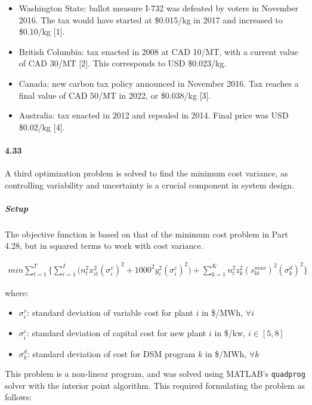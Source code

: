 \documentclass{article}
\begin{document}
	\begin{itemize}
		\item Washington State: ballot measure I-732 was defeated by voters in November 2016. The tax would have started at \$0.015/kg in 2017 and increased to \$0.10/kg [1].
		\item British Columbia: tax enacted in 2008 at CAD 10/MT, with a current value of CAD 30/MT [2]. This corresponds to USD \$0.023/kg.
		\item Canada: new carbon tax policy announced in November 2016. Tax reaches a final value of CAD 50/MT in 2022, or \$0.038/kg [3].
		\item Australia: tax enacted in 2012 and repealed in 2014. Final price was USD \$0.02/kg [4].
	\end{itemize}



\paragraph{4.33}
	A third optimization problem is solved to find the minimum cost variance, as controlling variability and uncertainty is a crucial component in system design. 
	
	\subparagraph{Setup}
		The objective function is based on that of the minimum cost problem in Part 4.28, but in squared terms to work with cost variance. 
	
	\begin{align*}
		min \sum_{t=1}^{T} \bigg\{ 
		\sum_{i=1}^{I} \big( n_t^2 x_{it}^2 (\sigma_i^v)^2 + 1000^2 y_i^2 (\sigma_i^c)^2 \big)
		+ \sum_{k=1}^{K}  n_t^2 z_k^2 (s_{kt}^{max})^2 (\sigma_k^d)^2 
		\bigg\}
	\end{align*}
	
	where:
	\begin{itemize}
		\item $\sigma_i^v$: standard deviation of variable cost for plant $i$ in \$/MWh, $\forall i$
		\item $\sigma_i^c$: standard deviation of capital cost for new plant $i$ in \$/kw, $i \in [5,8]$
		\item $\sigma_k^d$: standard deviation of cost for DSM program $k$ in \$/MWh, $\forall k$
	\end{itemize}
	
	This problem is a non-linear program, and was solved using MATLAB's \texttt{quadprog} solver with the interior point algorithm. This required formulating the problem as follows:
	
\end{document}
